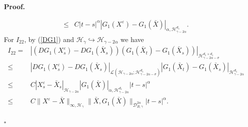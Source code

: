 \documentclass[10pt,a4paper]{article}
\numberwithin{equation}{section}
\newenvironment{proof}[1][\normalfont\bfseries Proof]{%
	\noindent #1.\hspace{0.5em}%
	\ignorespaces%
}{%
	\hfill $\square$%
	\par%
}
\begin{document}
\begin{proof}
\begin{align}
		\leq & C |t-s|^\alpha |G_1(X^\varepsilon)-G_1(\bar{X})|_{\alpha, \mathcal H_{\gamma-2\alpha}^{d_1}}.
	\end{align}
	For $I_{22}$, by (\ref{DG1}) and $\mathcal H_\gamma \hookrightarrow \mathcal H_{\gamma-2\alpha}$ we have	
	\begin{align}\label{I22}
		I_{22}=&\left|(DG_1(X_s^\varepsilon)-DG_1(\bar{X}_s)) (G_1(\bar{X}_t)-G_1(\bar{X}_s))  \right|_{\mathcal H_{\gamma-2\alpha-\sigma}^{d_1 \times d_1}} \nonumber\\
		\leq & \left|DG_1(X_s^\varepsilon)-DG_1(\bar{X}_s) \right|_{\mathcal L(\mathcal H_{\gamma-2\alpha};\mathcal H_{\gamma-2\alpha-\sigma}^{d_1 })} |G_1(\bar{X}_t)-G_1(\bar{X}_s)|_{\mathcal H_{\gamma-2\alpha}^{d_1 }} \nonumber\\
		\leq & C |X_s^\varepsilon-\bar{X}_s|_{\mathcal H_{\gamma-2\alpha}} |G_1(\bar{X})|_{\alpha, \mathcal H_{\gamma-2\alpha}^{d_1}} |t-s|^\alpha \nonumber\\
		\leq & C \|X^\varepsilon-\bar{X}\|_{\infty,\mathcal H_\gamma} \|\bar{X},G_1(\bar{X})\|_{\mathcal D_{B,\gamma}^{2\alpha}}  |t-s|^\alpha.
	\end{align}	
	
	
	

\end{proof}
\end{document}
